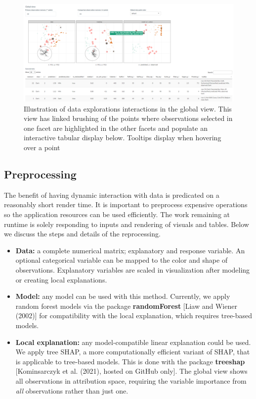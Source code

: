 \documentclass[
  article]{article}
\begin{document}
\begin{figure}

{\centering \includegraphics[width=1\linewidth]{./figures/app_interactions} 

}

\caption{Illustration of data explorations interactions in the global view. This view has linked brushing of the points where observations selected in one facet are highlighted in the other facets and populate an interactive tabular display below. Tooltips display when hovering over a point}\label{fig:interactions}
\end{figure}

\hypertarget{preprocessing}{%
\subsection{Preprocessing}\label{preprocessing}}

The benefit of having dynamic interaction with data is predicated on a reasonably short render time. It is important to preprocess expensive operations so the application resources can be used efficiently. The work remaining at runtime is solely responding to inputs and rendering of visuals and tables. Below we discuss the steps and details of the reprocessing.




\begin{itemize}
    \item \textbf{Data:} a complete numerical matrix; explanatory and response variable. An optional categorical variable can be mapped to the color and shape of observations. Explanatory variables are scaled in visualization after modeling or creating local explanations. 
    \item \textbf{Model:} any model can be used with this method. Currently, we apply random forest models via the package \textbf{randomForest} [Liaw and Wiener (2002)] for compatibility with the local explanation, which requires tree-based models.
    \item \textbf{Local explanation:} any model-compatible linear explanation could be used. We apply tree SHAP, a more computationally efficient variant of SHAP, that is applicable to tree-based models. This is done with the package \textbf{treeshap} [Kominsarczyk et al. (2021), hosted on GitHub only]. The global view shows all observations in attribution space, requiring the variable importance from \emph{all} observations rather than just one.
\end{itemize}
\end{document}

